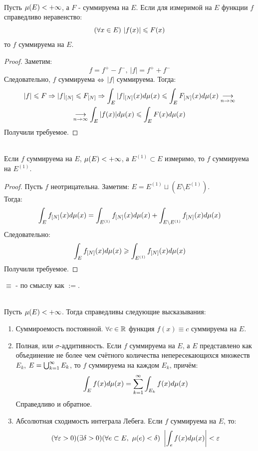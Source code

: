 \begin{lemma}\label{12l1}\\
	Пусть $\mu(E)<{+\infty}$, а $F$ - суммируема на $E$. Если для измеримой на $E$ функции $f$ справедливо неравенство:
	\[(\fa x\in E)\ |f(x)|\le F(x)\]
	то $f$ суммируема на $E$.
\end{lemma}
\begin{proof}
	Заметим:
	\[f=f^+-f^-,\ |f|=f^++f^-\]
	Следовательно, $f$ суммируема $\Leftrightarrow$ $|f|$ суммируема. Тогда:
	\begin{multline*}
		|f|\leqslant F\Rightarrow |f|_{[N]}\leqslant F_{[N]}\Rightarrow \int_E|f|_{[N]}(x)d\mu(x)\leqslant\int_EF_{[N]}(x)d\mu(x)\underset{n\rightarrow\infty}{\longrightarrow}\\
		\underset{n\rightarrow\infty}{\longrightarrow}\int_E|f(x)|d\mu(x)\leqslant\int_EF(x)d\mu(x)
	\end{multline*}
	Получили требуемое.
\end{proof}
\begin{lemma}\label{12l2}\\
	Если $f$ суммируема на $E$, $\mu(E)<{+\infty}$, а $E^{(1)}\subset E$ измеримо, то $f$ суммируема на $E^{(1)}$.
\end{lemma}
\begin{proof}
	Пусть $f$ неотрицательна. Заметим: $E=E^{(1)}\sqcup(E\setminus E^{(1)})$.\\
	Тогда:
	\[\int_E{f_{[{N}]}}(x)d\mu(x)=\int_{E^{(1)}}{f_{[{N}]}}(x)d\mu(x)+\int_{E\setminus E^{(1)}}{f_{[{N}]}}(x)d\mu(x)\]
	Следовательно:
	\[\int_E{f_{[{N}]}}(x)d\mu(x)\geqslant\int_{E^{(1)}}{f_{[{N}]}}(x)d\mu(x)\]
	Получили требуемое.
\end{proof}
\begin{anote}
	$\equiv$ - по смыслу как $:=$.
\end{anote}
\begin{theorem}\label{12th3}\\
	Пусть $\mu(E)<{+\infty}$. Тогда справедливы следующие высказывания:
	\begin{enumerate}
		\item Суммироемость постоянной. $\forall c\in\mathbb{R}$ функция $f(x)\equiv c$ суммируема на $E$.
		\item Полная, или $\sigma$-аддитивность. Если $f$ суммируема на $E$, а $E$ представлено как объединение не более чем счётного количества непересекающихся множеств $E_k$, $E=\bigcup_{k=1}^\infty E_k$, то $f$ суммируема на каждом $E_k$, причём:
		\[\int_Ef(x)d\mu(x)=\sum_{k=1}^\i\int_{E_k}f(x)d\mu(x)\]
		Справедливо и обратное.
		\item Абсолютная сходимость интеграла Лебега. Если $f$ суммируема на $E$, то:
		\[(\fa\eps>0)(\ex\delta>0)(\fa e\subset E,\ \mu(e)<\delta)\ \l|\int_ef(x)d\mu(x)\r|<\eps\]
	\end{enumerate}
\end{theorem}
